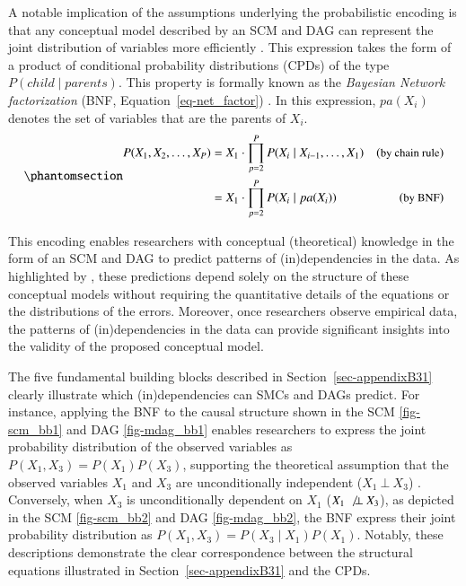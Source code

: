 \documentclass[
  authoryear,
  review,
  1p]{elsarticle}
\begin{document}
A notable implication of the assumptions underlying the probabilistic
encoding is that any conceptual model described by an SCM and DAG can
represent the joint distribution of variables more efficiently
\citep[p.~29]{Pearl_et_al_2016}. This expression takes the form of a
product of conditional probability distributions (CPDs) of the type
\(P(child \mid parents)\). This property is formally known as the
\emph{Bayesian Network factorization} (BNF,
Equation~\ref{eq-net_factor})
\citetext{\citealp[p.~29]{Pearl_et_al_2016}; \citealp[p.~21]{Neal_2020}}.
In this expression, \(pa(X_{i})\) denotes the set of variables that are
the parents of \(X_{i}\).
\begin{equation}\phantomsection\label{eq-net_factor}{
\begin{aligned}
P(X_{1}, X_{2}, \dots, X_{P}) & = X_{1} \cdot \prod^{P}_{p=2} P(X_{i} \mid X_{i-1}, \dots, X_{1}) & (\small{\text{by chain rule})}\\
& = X_{1} \cdot \prod^{P}_{p=2} P(X_{i} \mid pa(X_{i}) ) & (\small{\text{by BNF}})
\end{aligned}
}\end{equation}

This encoding enables researchers with conceptual (theoretical)
knowledge in the form of an SCM and DAG to predict patterns of
(in)dependencies in the data. As highlighted by
\citet[p.~35]{Pearl_et_al_2016}, these predictions depend solely on the
structure of these conceptual models without requiring the quantitative
details of the equations or the distributions of the errors. Moreover,
once researchers observe empirical data, the patterns of
(in)dependencies in the data can provide significant insights into the
validity of the proposed conceptual model.

The five fundamental building blocks described in
Section~\ref{sec-appendixB31} clearly illustrate which (in)dependencies
can SMCs and DAGs predict. For instance, applying the BNF to the causal
structure shown in the SCM \ref{fig-scm_bb1} and DAG \ref{fig-mdag_bb1}
enables researchers to express the joint probability distribution of the
observed variables as \(P(X_{1}, X_{3}) = P(X_{1}) P(X_{3})\),
supporting the theoretical assumption that the observed variables
\(X_{1}\) and \(X_{3}\) are unconditionally independent
(\(X_{1} \:\bot\:X_{3}\)) \citep[p.~24]{Neal_2020}. Conversely, when
\(X_{3}\) is unconditionally dependent on \(X_{1}\)
(\(X_{1} \:\not\bot\:X_{3}\)), as depicted in the SCM \ref{fig-scm_bb2}
and DAG \ref{fig-mdag_bb2}, the BNF express their joint probability
distribution as \(P(X_{1}, X_{3}) = P(X_{3} \mid X_{1}) P(X_{1})\).
Notably, these descriptions demonstrate the clear correspondence between
the structural equations illustrated in Section~\ref{sec-appendixB31}
and the CPDs.
\end{document}
